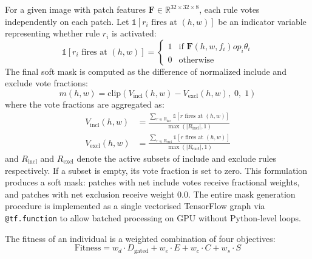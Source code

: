 \documentclass[runningheads]{llncs}
\begin{document}
For a given image with patch features $\mathbf{F} \in \mathbb{R}^{32 \times 32 \times 8}$, each rule votes independently on each patch. Let $\mathbb{1}[r_i \text{ fires at } (h,w)]$ be an indicator variable representing whether rule $r_i$ is activated:
\begin{equation}
\mathbb{1}[r_i \text{ fires at } (h,w)] = \begin{cases} 
1 & \text{if } \mathbf{F}(h,w,f_i) \mathbin{op_i} \theta_i \\
0 & \text{otherwise} 
\end{cases}
\end{equation}
The final soft mask is computed as the difference of normalized include and exclude vote fractions:
\begin{equation}
m(h,w) = \text{clip}\!\left(V_{\text{incl}}(h,w) - V_{\text{excl}}(h,w),\; 0,\; 1\right)
\label{eq:softmask}
\end{equation}
where the vote fractions are aggregated as:
\begin{equation}
\begin{aligned}
V_{\text{incl}}(h,w) &= \frac{\sum_{r \in R_{\text{incl}}} \mathbb{1}[r \text{ fires at } (h,w)]}{\max(|R_{\text{incl}}|, 1)} \\[1ex]
V_{\text{excl}}(h,w) &= \frac{\sum_{r \in R_{\text{excl}}} \mathbb{1}[r \text{ fires at } (h,w)]}{\max(|R_{\text{excl}}|, 1)}
\end{aligned}
\end{equation}
and $R_{\text{incl}}$ and $R_{\text{excl}}$ denote the active subsets of include and exclude rules respectively. If a subset is empty, its vote fraction is set to zero. This formulation produces a soft mask: patches with net include votes receive fractional weights, and patches with net exclusion receive weight 0.0. The entire mask generation procedure is implemented as a single vectorised TensorFlow graph via \texttt{@tf.function} to allow batched processing on GPU without Python-level loops.

The fitness of an individual is a weighted combination of four objectives:
\begin{equation}
\text{Fitness} = w_d \cdot D_{\text{gated}} + w_e \cdot E + w_c \cdot C + w_s \cdot S
\label{eq:fitness}
\end{equation}
\end{document}
